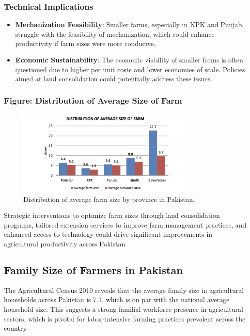 \documentclass[12pt]{article}
\begin{document}
\subsubsection{Technical Implications}
\begin{itemize}
    \item \textbf{Mechanization Feasibility}: Smaller farms, especially in KPK and Punjab, struggle with the feasibility of mechanization, which could enhance productivity if farm sizes were more conducive.
    \item \textbf{Economic Sustainability}: The economic viability of smaller farms is often questioned due to higher per unit costs and lower economies of scale. Policies aimed at land consolidation could potentially address these issues.
\end{itemize}

\subsubsection{Figure: Distribution of Average Size of Farm}
\begin{figure}[H]
    \centering
    \includegraphics[width=0.8\textwidth]{img/distribution_of_farm_sizes.png}
    \caption{Distribution of average farm size by province in Pakistan.}
    \label{fig:farm_size_distribution}
\end{figure}

Strategic interventions to optimize farm sizes through land consolidation programs, tailored extension services to improve farm management practices, and enhanced access to technology could drive significant improvements in agricultural productivity across Pakistan.

\subsection{Family Size of Farmers in Pakistan}
The Agricultural Census 2010 reveals that the average family size in agricultural households across Pakistan is 7.1, which is on par with the national average household size. This suggests a strong familial workforce presence in agricultural sectors, which is pivotal for labor-intensive farming practices prevalent across the country.
\end{document}
